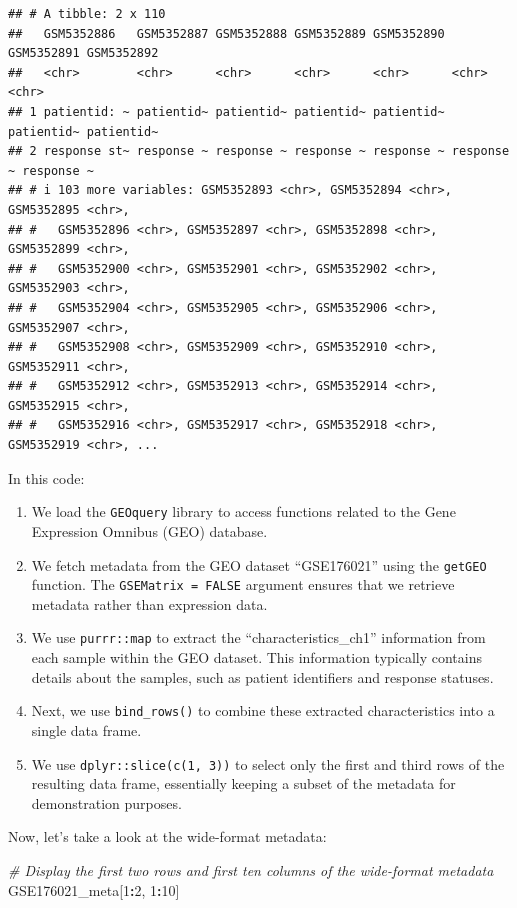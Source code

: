\documentclass[
]{book}
\newenvironment{Shaded}{\begin{snugshade}}{\end{snugshade}}
\newcommand{\CommentTok}[1]{\textcolor[rgb]{0.56,0.35,0.01}{\textit{#1}}}
\newcommand{\DecValTok}[1]{\textcolor[rgb]{0.00,0.00,0.81}{#1}}
\newcommand{\NormalTok}[1]{#1}
\newcommand{\SpecialCharTok}[1]{\textcolor[rgb]{0.81,0.36,0.00}{\textbf{#1}}}
\begin{document}
\begin{verbatim}
## # A tibble: 2 x 110
##   GSM5352886   GSM5352887 GSM5352888 GSM5352889 GSM5352890 GSM5352891 GSM5352892
##   <chr>        <chr>      <chr>      <chr>      <chr>      <chr>      <chr>     
## 1 patientid: ~ patientid~ patientid~ patientid~ patientid~ patientid~ patientid~
## 2 response st~ response ~ response ~ response ~ response ~ response ~ response ~
## # i 103 more variables: GSM5352893 <chr>, GSM5352894 <chr>, GSM5352895 <chr>,
## #   GSM5352896 <chr>, GSM5352897 <chr>, GSM5352898 <chr>, GSM5352899 <chr>,
## #   GSM5352900 <chr>, GSM5352901 <chr>, GSM5352902 <chr>, GSM5352903 <chr>,
## #   GSM5352904 <chr>, GSM5352905 <chr>, GSM5352906 <chr>, GSM5352907 <chr>,
## #   GSM5352908 <chr>, GSM5352909 <chr>, GSM5352910 <chr>, GSM5352911 <chr>,
## #   GSM5352912 <chr>, GSM5352913 <chr>, GSM5352914 <chr>, GSM5352915 <chr>,
## #   GSM5352916 <chr>, GSM5352917 <chr>, GSM5352918 <chr>, GSM5352919 <chr>, ...
\end{verbatim}

In this code:

\begin{enumerate}
\def\labelenumi{\arabic{enumi}.}
\item
  We load the \texttt{GEOquery} library to access functions related to the Gene Expression Omnibus (GEO) database.
\item
  We fetch metadata from the GEO dataset ``GSE176021'' using the \texttt{getGEO} function. The \texttt{GSEMatrix\ =\ FALSE} argument ensures that we retrieve metadata rather than expression data.
\item
  We use \texttt{purrr::map} to extract the ``characteristics\_ch1'' information from each sample within the GEO dataset. This information typically contains details about the samples, such as patient identifiers and response statuses.
\item
  Next, we use \texttt{bind\_rows()} to combine these extracted characteristics into a single data frame.
\item
  We use \texttt{dplyr::slice(c(1,\ 3))} to select only the first and third rows of the resulting data frame, essentially keeping a subset of the metadata for demonstration purposes.
\end{enumerate}

Now, let's take a look at the wide-format metadata:

\begin{Shaded}
\begin{Highlighting}[]
\CommentTok{\# Display the first two rows and first ten columns of the wide{-}format metadata}
\NormalTok{GSE176021\_meta[}\DecValTok{1}\SpecialCharTok{:}\DecValTok{2}\NormalTok{, }\DecValTok{1}\SpecialCharTok{:}\DecValTok{10}\NormalTok{]}
\end{Highlighting}
\end{Shaded}
\end{document}
